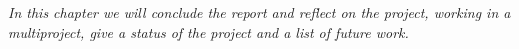 \emph{In this chapter we will conclude the report and reflect on the project, working in a multiproject, give a status of the project and a list of future work.} 